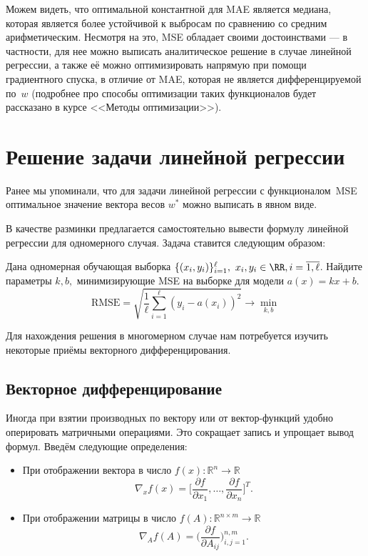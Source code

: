 \documentclass[12pt,fleqn]{article}
\begin{document}
	\par Можем видеть, что оптимальной константной для MAE является медиана, которая является более устойчивой к выбросам по сравнению со средним арифметическим. Несмотря на это, MSE обладает своими достоинствами — в частности, для нее можно выписать аналитическое решение в случае линейной регрессии, а также её можно оптимизировать напрямую при помощи градиентного спуска, в отличие от MAE, которая не является дифференцируемой по~$w$ (подробнее про способы оптимизации таких функционалов будет рассказано в курсе <<Методы оптимизации>>).


\section{Решение задачи линейной регрессии}

	\par Ранее мы упоминали, что для задачи линейной регрессии с функционалом~MSE оптимальное значение вектора весов $w^*$ можно выписать в явном виде.

В качестве разминки предлагается самостоятельно вывести формулу линейной регрессии для одномерного случая. Задача ставится следующим образом:

\begin{vkProblem} Дана одномерная обучающая выборка $\{(x_i, y_i)\}_{i=1}^\ell, \  x_i, y_i \in \RR, i = \overline{1, \ell}$. Найдите параметры $k, b,$ минимизирующие MSE на выборке для модели $a(x) = kx + b.$
\[
\text{RMSE} = \sqrt{\frac{1}{\ell}\sum_{i=1}^\ell (y_i - a(x_i))^2}\rightarrow\min_{k,b}
\]
\end{vkProblem}

Для нахождения решения в многомерном случае нам потребуется изучить некоторые приёмы векторного дифференцирования.


\subsection{Векторное дифференцирование}

Иногда при взятии производных по вектору или от вектор-функций удобно оперировать матричными операциями. Это сокращает запись и упрощает вывод формул. Введём следующие определения:
\begin{itemize}
	
	\item При отображении вектора в число $f(x): \mathbb{R}^n \rightarrow \mathbb{R}$ 
\[
\nabla_x f(x) = \bigg[\frac{\partial f}{\partial x_1}, \ldots, \frac{\partial f}{\partial x_n}\bigg]^T.
\]

	\item При отображении матрицы в число $f(A): \mathbb{R}^{n\times m} \rightarrow \mathbb{R}$
\[
\nabla_A f(A) = \bigg(\frac{\partial f}{\partial A_{ij}}\bigg)_{i,j=1}^{n,m}.
\]

\end{itemize}
\end{document}
